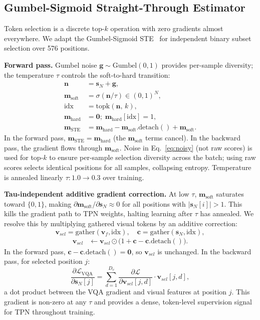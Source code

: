 \documentclass{article}
\newcommand{\vfine}{\mathbf{v}_{f}}
\newcommand{\sN}{\mathbf{s}_N}
\newcommand{\vsel}{\mathbf{v}_{sel}}
\begin{document}
\subsection{Gumbel-Sigmoid Straight-Through Estimator}
\label{sec:ste}

Token selection is a discrete top-$k$ operation with zero gradients almost everywhere.
We adapt the Gumbel-Sigmoid STE~\cite{jang2017categorical, bengio2013estimating}
for independent binary subset selection over 576 positions.

\textbf{Forward pass.} Gumbel noise $\mathbf{g} \sim \mathrm{Gumbel}(0,1)$ provides
per-sample diversity; the temperature $\tau$ controls the soft-to-hard transition:
\begin{align}
  \mathbf{n} &= \sN + \mathbf{g}, \label{eq:noisy} \\
  \mathbf{m}_{\mathrm{soft}} &= \sigma(\mathbf{n} / \tau) \in (0,1)^N, \label{eq:soft} \\
  \text{idx} &= \mathrm{topk}(\mathbf{n},\, k), \label{eq:topk} \\
  \mathbf{m}_{\mathrm{hard}} &= \mathbf{0};\; \mathbf{m}_{\mathrm{hard}}[\text{idx}] = 1, \label{eq:hard} \\
  \mathbf{m}_{\mathrm{STE}} &= \mathbf{m}_{\mathrm{hard}}
    - \mathbf{m}_{\mathrm{soft}}.\mathrm{detach}()
    + \mathbf{m}_{\mathrm{soft}}. \label{eq:ste}
\end{align}
In the forward pass, $\mathbf{m}_{\mathrm{STE}} = \mathbf{m}_{\mathrm{hard}}$
(the $\mathbf{m}_{\mathrm{soft}}$ terms cancel).
In the backward pass, the gradient flows through $\mathbf{m}_{\mathrm{soft}}$.
Noise in Eq.~\eqref{eq:noisy} (not raw scores) is used for top-$k$
to ensure per-sample selection diversity across the batch;
using raw scores selects identical positions for all samples, collapsing entropy.
Temperature is annealed linearly $\tau: 1.0 \to 0.3$ over training.

\textbf{Tau-independent additive gradient correction.}
At low $\tau$, $\mathbf{m}_{\mathrm{soft}}$ saturates toward $\{0,1\}$, making
$\partial \mathbf{m}_{\mathrm{soft}} / \partial \sN \approx 0$ for all
positions with $|\sN[i]| > 1$.
This kills the gradient path to TPN weights, halting learning after $\tau$
has annealed.
We resolve this by multiplying gathered visual tokens by an additive correction:
\begin{equation}
  \vsel = \mathrm{gather}(\vfine, \text{idx}), \quad
  \mathbf{c} = \mathrm{gather}(\sN, \text{idx}), \label{eq:gather}
\end{equation}
\begin{align}
  \vsel &\leftarrow \vsel \odot \bigl(1 + \mathbf{c} - \mathbf{c}.\mathrm{detach}()\bigr).
  \label{eq:taufix}
\end{align}
In the forward pass, $\mathbf{c} - \mathbf{c}.\mathrm{detach}() = \mathbf{0}$,
so $\vsel$ is unchanged.
In the backward pass, for selected position $j$:
\[
  \frac{\partial \mathcal{L}_\mathrm{VQA}}{\partial \sN[j]}
  = \sum_{d=1}^{D_v} \frac{\partial \mathcal{L}}{\partial \vsel[j,d]} \cdot \vsel[j,d],
\]
a dot product between the VQA gradient and visual features at position $j$.
This gradient is non-zero at any $\tau$ and provides a dense, token-level
supervision signal for TPN throughout training.
\end{document}

